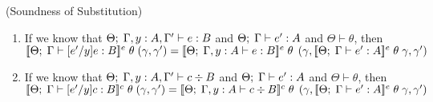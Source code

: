 \begin{lemma}{(Soundness of Substitution)}
\begin{enumerate}
\item If we know that ${\Theta};\;{\Gamma, y:A, \Gamma'} \vdash {e} : {B}$ and ${\Theta};\;{\Gamma} \vdash {e'} : {A}$
  and $\Theta \vdash \theta$, 
  then $[\![{{\Theta};\;{\Gamma} \vdash {[e'/y]e} : {B}}]\!]^e\;\theta\;(\gamma,\gamma') = 
        [\![{{\Theta};\;{\Gamma, y:A} \vdash {e} : {B}}]\!]^e\;\theta 
                \;\left(\gamma, 
                        [\![{{\Theta};\;{\Gamma} \vdash {e'} : {A}}]\!]^e\;\theta\;\gamma,
                        \gamma'
                \right)$

\item If we know that ${\Theta};\;{\Gamma, y:A, \Gamma'} \vdash {c} \div {B}$ and ${\Theta};\;{\Gamma} \vdash {e'} : {A}$
  and $\Theta \vdash \theta$, 
  then $[\![{{\Theta};\;{\Gamma} \vdash {[e'/y]c} : {B}}]\!]^c\;\theta\;(\gamma,\gamma') = 
        [\![{{\Theta};\;{\Gamma, y:A} \vdash {c} \div {B}}]\!]^c\;\theta \;
                \left(\gamma,
                      [\![{{\Theta};\;{\Gamma} \vdash {e'} : {A}}]\!]^e\;\theta\;\gamma,
                      \gamma'
                \right)$
\end{enumerate}
\end{lemma}

